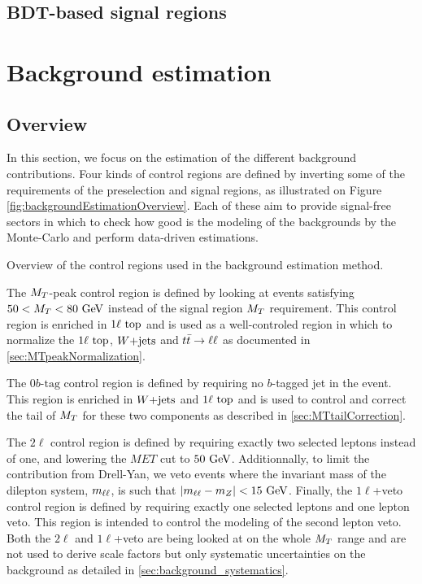         \subsection{BDT-based signal regions}
        
            \loremipsum

    \section{Background estimation \label{sec:analysis_backgroundEstimation}}

        \subsection{Overview} 

        In this section, we focus on the estimation of the different background contributions. 
        Four kinds of control regions are defined by inverting some of the requirements of the
        preselection and signal regions, as illustrated on Figure \ref{fig:backgroundEstimationOverview}.
        Each of these aim to provide signal-free sectors in which to check how good is the modeling
        of the backgrounds by the Monte-Carlo and perform data-driven estimations.

                         {Overview of the control regions used in the background estimation method.}

        The $M_T$-peak control region is defined by looking at events satisfying $50 < M_T < 80 ~\text{GeV}$
        instead of the signal region $M_T$ requirement. This control region is enriched in $1\ell~\text{top}$
        and is used as a well-controled region in which to normalize the $1\ell~\text{top}$, $\text{$W$+jets}$ 
        and $t\bar{t} \rightarrow \ell \ell$ as documented in \ref{sec:MTpeakNormalization}.
        
        The $0b\text{-tag}$ control region is defined by requiring no $b$-tagged jet in the event.
        This region is enriched in $\text{$W$+jets}$ and $1\ell~\text{top}$ and is used to control and correct 
        the tail of $M_T$ for these two components as described in \ref{sec:MTtailCorrection}.

        The $2\ell$ control region is defined by requiring exactly two selected leptons instead of
        one, and lowering the $MET$ cut to $50 ~\text{GeV}$. Additionnally, to limit the contribution
        from Drell-Yan, we veto events where the invariant mass of the dilepton system, $m_{\ell\ell}$,
        is such that $\left|m_{\ell\ell} - m_{Z}\right| < 15 ~\text{GeV}$. Finally, the $1\ell$+veto control 
        region is defined by requiring exactly one selected leptons and one lepton veto. This region 
        is intended to control the modeling of the second lepton veto. Both the $2\ell$ and $1\ell$+veto
        are being looked at on the whole $M_T$ range and are not used to derive scale factors but only 
        systematic uncertainties on the background as detailed in \ref{sec:background_systematics}.

